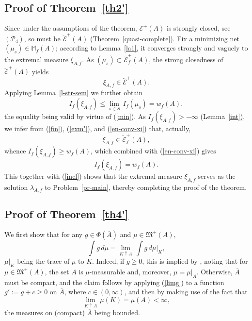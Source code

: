 \documentclass[12pt,a4paper,reqno]{amsart} %
\theoremstyle{lause}
\theoremstyle{maaritelma}
\theoremstyle{lause}
\theoremstyle{maaritelma}
\numberwithin{equation}{section}
\begin{document}
\subsection{Proof of Theorem~\ref{th2'}}\label{sec-pr1} Since under the assumptions of the theorem, $\mathcal E^+(A)$ is strongly closed, see $(\mathcal P_4)$, so must be $\breve{\mathcal E}^+(A)$ (Theorem~\ref{quasi-complete}). Fix a minimizing net $(\mu_s)\in\mathbb M_f(A)$; according to Lemma~\ref{la1}, it converges strongly and vaguely to the extremal measure $\xi_{A,f}$. As $(\mu_s)\subset\breve{\mathcal E}^+_f(A)$, the strong closedness of $\breve{\mathcal E}^+(A)$ yields
\begin{equation}\label{exm'}
\xi_{A,f}\in\breve{\mathcal E}^+(A).
\end{equation}
Applying Lemma~\ref{l-str-sem} we further obtain
\begin{equation}\label{en-conv-xi}
 I_f(\xi_{A,f})\leqslant\lim_{s\in S}\,I_f(\mu_s)=w_f(A),
\end{equation}
the equality being valid by virtue of (\ref{min}). As $I_f(\xi_{A,f})>-\infty$ (Lemma~\ref{int}), we infer from (\ref{fin}), (\ref{exm'}), and (\ref{en-conv-xi}) that, actually,
\begin{equation}\label{incl}
\xi_{A,f}\in\breve{\mathcal E}_f^+(A),
\end{equation}
whence $I_f(\xi_{A,f})\geqslant w_f(A)$, which combined with (\ref{en-conv-xi}) gives
\[I_f(\xi_{A,f})=w_f(A).\]
This together with (\ref{incl}) shows that the extremal measure $\xi_{A,f}$ serves as the solution $\lambda_{A,f}$ to Problem~\ref{pr-main}, thereby completing the proof of the theorem.

\subsection{Proof of Theorem~\ref{th4'}}\label{sec-pr2} We first show that for any $g\in\Phi(\overline{A})$ and $\mu\in\mathfrak M^+(A)$,
\begin{equation}\label{limg}
 \int g\,d\mu=\lim_{K\uparrow A}\,\int g\,d\mu|_K,
\end{equation}
$\mu|_K$ being the trace of $\mu$ to $K$. Indeed, if $g\geqslant0$, this is implied by \cite[Lemma~1.2.2]{F1}, noting that for  $\mu\in\mathfrak M^+(A)$, the set $A$ is $\mu$-measurable and, moreover, $\mu=\mu|_A$. Otherwise, $\overline{A}$ must be compact, and the claim follows by applying (\ref{limg}) to a function $g':=g+c\geqslant0$ on $\overline{A}$, where $c\in(0,\infty)$, and then by making use of the fact that
\[\lim_{K\uparrow A}\,\mu(K)=\mu(A)<\infty,\]
the measures on (compact) $\overline{A}$ being bounded.
\end{document}
